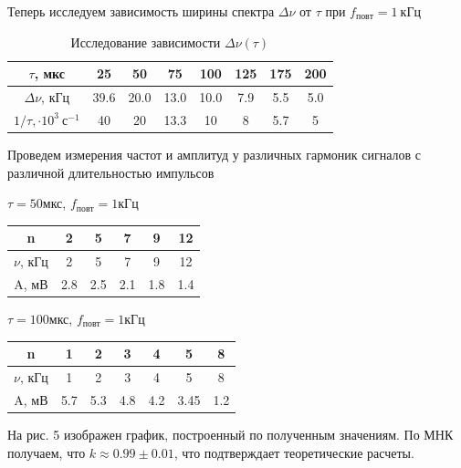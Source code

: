 \documentclass[12pt,a4paper]{article}
\begin{document}
\newpage

Теперь исследуем зависимость ширины спектра $\Delta\nu$ от $\tau$ при $f_{повт} = 1\ кГц$

\begin{table}[htp]
    \centering
    \begin{tabular}[]{|c|c|c|c|c|c|c|c|}
        \hline
        $\tau$, мкс & 25 & 50 & 75& 100& 125& 175& 200\\
        \hline
        $\Delta \nu$, кГц & 39.6 & 20.0 & 13.0 & 10.0 & 7.9& 5.5& 5.0\\
        \hline
        $1/\tau, \cdot 10^3\ с^{-1}$ & 40 & 20 & 13.3 & 10 & 8 & 5.7 & 5\\
        \hline
    \end{tabular}
    \caption{Исследование зависимости $\Delta \nu (\tau)$}
\end{table}

Проведем измерения частот и амплитуд у различных гармоник сигналов с различной длительностью импульсов
\begin{table}[htp]
    \centering
    $\tau = 50$мкс, $f_{повт} = 1$кГц

    \begin{tabular}[]{|c|c|c|c|c|c|}
        \hline
        n & 2&5&7&9&12\\
        \hline
        $\nu$, кГц & 2&5&7&9&12\\
        \hline
        A, мВ&2.8&2.5&2.1&1.8&1.4\\
        \hline
    \end{tabular}
\end{table}

\begin{table}[h!]
    \centering
    $\tau = 100$мкс, $f_{повт} = 1$кГц

    \begin{tabular}[]{|c|c|c|c|c|c|c|}
        \hline
        n & 1& 2& 3& 4& 5 & 8\\
        \hline
        $\nu$, кГц &  1& 2& 3& 4& 5&8\\
        \hline
        A, мВ& 5.7& 5.3& 4.8& 4.2& 3.45 & 1.2\\
        \hline
    \end{tabular}
\end{table}

На рис. 5 изображен график, построенный по полученным значениям.
По МНК получаем, что $k\approx 0.99 \pm 0.01$, что подтверждает теоретические расчеты.
\end{document}
